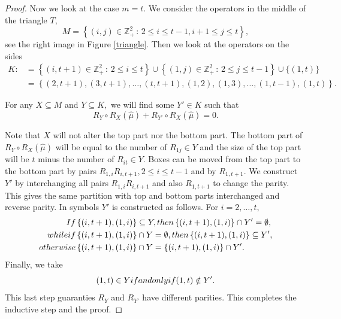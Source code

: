 \documentclass[10pt,a4paper]{amsart}
\newcommand{\tn}[1]{\textnormal{#1}}
\begin{document}
\begin{proof}
Now we look at the case $m=t.$ We consider the operators in the middle of the triangle $T,$
\[M= \left\{(i,j) \in \mathbb{Z}^2_{+} \, : \,  2 \leq i \leq t-1 , i+1 \leq j \leq t \right\},\]
see the right image in Figure \ref{triangle}.
Then we look at the operators on the sides
\begin{align*}
K:&= \left\{ (i,t+1) \in \mathbb{Z}^2_{+}\, : \, 2 \leq i \leq t  \right\} \cup \left \{ (1,j) \in \mathbb{Z}^2_{+} \, : \, 2 \leq j \leq t-1\right\} \cup \{(1,t)\} \\
&= \left\{(2,t+1),(3,t+1),\ldots, (t,t+1),(1,2),(1,3),\ldots, (1,t-1), (1,t) \right \}.
\end{align*}

For any $X \subseteq M$ and $Y \subseteq K,$ we will find some $Y' \in K$ such that
\[R_Y \circ R_X (\hat{\mu}) + R_{Y'} \circ R_X (\hat{\mu}) = 0.\]

Note that $X$ will not alter the top part nor the bottom part. The bottom part of 
$R_Y \circ R_X (\hat{\mu})$ will be equal to the number of $R_{1j}\in Y$ and the size of the top part will be $t$ minus the number of $R_{it}\in Y$. Boxes can be moved from the top part to the bottom part by  pairs 
$R_{1,i}R_{i,t+1}, 2\le i\le t-1$ and by $R_{1,t+1}$. We construct $Y'$ by interchanging all pairs $R_{1,i}R_{i,t+1}$ and also $R_{1,t+1}$ to change the parity. This gives the same partition with top and bottom parts interchanged and reverse parity.
In symbols $Y'$ is constructed as follows. For $i=2,\ldots, t,$
\begin{align*}
\tn{ If } &\left\{(i,t+1), (1, i)\right\} \subseteq Y, \tn{ then }  \left\{(i,t+1), (1, i)\right\} \cap Y'=\emptyset,\\
\tn{ while if } &\left\{(i,t+1), (1, i)\right\} \cap Y = \emptyset, \tn{ then }  \left\{(i,t+1), (1, i)\right\} \subseteq Y',\\
\tn{ otherwise } &\left\{(i,t+1), (1, i)\right\} \cap Y = \left\{(i,t+1), (1, i)\right\} \cap Y'.
\end{align*}
Finally, we take 
\[(1,t) \in Y \tn{ if and only if }(1,t) \notin Y'.\]
This last step guaranties $R_Y$ and $R_{Y'}$ have different parities. This completes the inductive step and the proof.
\end{proof}
\end{document}
